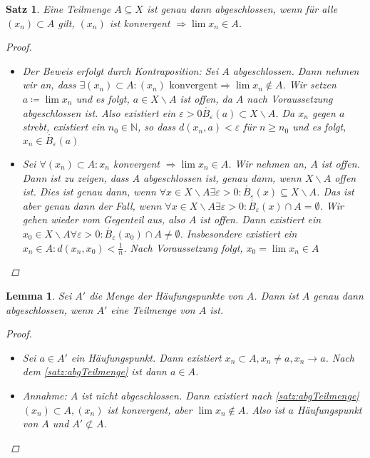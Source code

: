 \documentclass[ngerman,titlepage,twoside, parskip=half*]{scrreprt}
\newcommand*{\N}{\mathbb{N}}
\theoremstyle{break}
\newtheorem{lemma}{Lemma}
\newtheorem{theorem}{Satz}[section]
\theoremstyle{nonumberbreak}
\newtheorem{proof}{Beweis:}
\begin{document}
\begin{theorem}\label{satz:abgTeilmenge}
  Eine Teilmenge $A\subseteq X$ ist genau dann abgeschlossen, wenn für
  alle $(x_n) \subset A$ gilt, $(x_n)$ ist konvergent $\Rightarrow
  \lim x_n \in A$.
  \begin{proof}
    \begin{itemize}
     \item["`$\Rightarrow$"'] Der Beweis erfolgt durch Kontraposition: Sei $A$
      abgeschlossen. Dann nehmen wir an, dass $\exists (x_n)\subset
      A\colon(x_n) \text{ konvergent} \Rightarrow \lim x_n \notin A$. Wir
      setzen $a\coloneqq\lim x_n$ und es folgt, $a \in X\backslash A$ ist
      offen, da $A$ nach Voraussetzung abgeschlossen ist. Also existiert ein
      $\varepsilon >0 \mathring{B_{\varepsilon}}(a)\subset X\backslash A$. Da
      $x_n$ gegen $a$ strebt, existiert ein $n_0\in \N$, so dass
      $d(x_n,a)<\varepsilon$ für $n\geq n_0$ und es folgt, $x_n \in
      \mathring{B_{\varepsilon}}(a)$\lightning
     \item["`$\Leftarrow$"'] Sei $\forall (x_n)\subset A\colon x_n$ konvergent
      $\Rightarrow \lim x_n \in A$. Wir nehmen an, $A$ ist offen. Dann ist zu
      zeigen, dass $A$ abgeschlossen ist, genau dann, wenn
      $X\backslash A$  offen ist. Dies ist genau dann, wenn $\forall x
      \in X\backslash A \exists \varepsilon
      >0\colon\mathring{B_{\varepsilon}} (x)\subseteq X\backslash
      A$. Das ist aber genau dann der Fall, wenn $\forall x \in
      X\backslash A \exists \varepsilon
      >0\colon\mathring{B_{\varepsilon}} (x)\cap A = \emptyset$. Wir
      gehen wieder vom Gegenteil aus, also $A$ ist offen. Dann
      existiert ein $x_0 \in X\backslash A \forall \varepsilon
      >0\colon\mathring{B_{\varepsilon}}(x_0) \cap A \neq \emptyset$.
      Insbesondere existiert ein $x_n \in A \colon d(x_n,x_0)<\frac{1}{n}$.
      Nach Voraussetzung folgt, $x_0=\lim x_n \in A$\lightning
    \end{itemize}
  \end{proof}
\end{theorem}

\begin{lemma}
  Sei $A'$ die Menge der Häufungspunkte von $A$. Dann ist $A$ genau dann
  abgeschlossen, wenn $A'$ eine Teilmenge von $A$ ist.
  \begin{proof}
    \begin{itemize}
    \item["`$\Rightarrow$"'] Sei $a\in A'$ ein Häufungspunkt. Dann
      existiert $x_n \subset A, x_n\neq a, x_n\rightarrow a$. Nach dem
      \autoref{satz:abgTeilmenge} ist dann  $a \in A$.
    \item["`$\Leftarrow$"'] Annahme: $A$ ist nicht abgeschlossen. Dann
      existiert nach \autoref{satz:abgTeilmenge} $(x_n) \subset A,
      (x_n)$ ist konvergent, aber $\lim x_n\notin A$. Also ist $a$
      Häufungspunkt von $A$ und $A'\nsubset A$.\lightning
\end{itemize}
  \end{proof}
\end{lemma}
\end{document}
